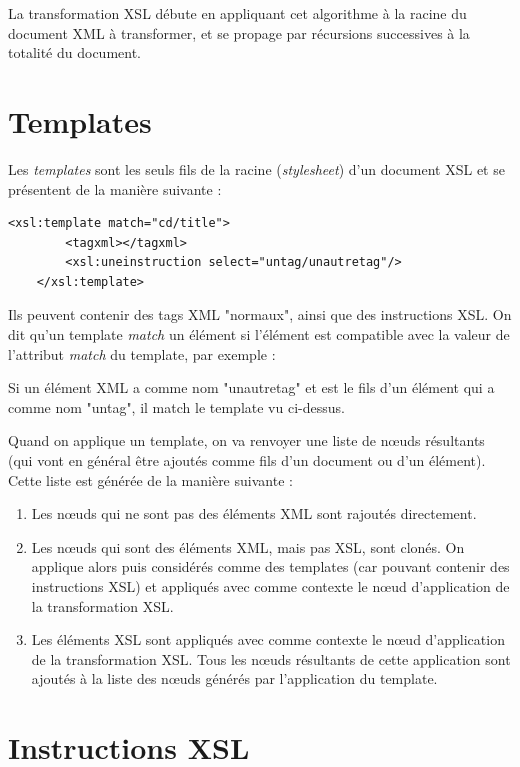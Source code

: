 La transformation XSL débute en appliquant cet algorithme à la racine du document XML à transformer, et se propage par récursions successives
à la totalité du document.

\section{Templates}

Les \textit{templates} sont les seuls fils de la racine (\textit{stylesheet}) d'un document XSL et se présentent de la manière suivante :

\begin{lstlisting}[frame=single]
    <xsl:template match="cd/title">
        <tagxml></tagxml>
        <xsl:uneinstruction select="untag/unautretag"/>
    </xsl:template>
\end{lstlisting}

Ils peuvent contenir des tags XML "normaux", ainsi que des instructions XSL.
On dit qu'un template \textit{match} un élément si l'élément est compatible avec la valeur de l'attribut \textit{match} du template, par exemple :

Si un élément XML a comme nom "unautretag" et est le fils d'un élément qui a comme nom "untag", il match le template vu ci-dessus.

Quand on applique un template, on va renvoyer une liste de nœuds résultants (qui vont en général être ajoutés comme fils d'un document ou d'un élément). Cette liste est générée de la manière suivante :\\

\begin{enumerate}
    \item Les nœuds qui ne sont pas des éléments XML sont rajoutés directement.
    \item Les nœuds qui sont des éléments XML, mais pas XSL, sont clonés. On applique alors  puis considérés comme des templates (car pouvant contenir des instructions XSL) et appliqués avec comme contexte le nœud d'application de la transformation XSL.
    \item Les éléments XSL sont appliqués avec comme contexte le nœud d'application de la transformation XSL. Tous les nœuds résultants de cette application sont ajoutés à la liste des nœuds générés par l'application du template.
\end{enumerate}

\section{Instructions XSL}

